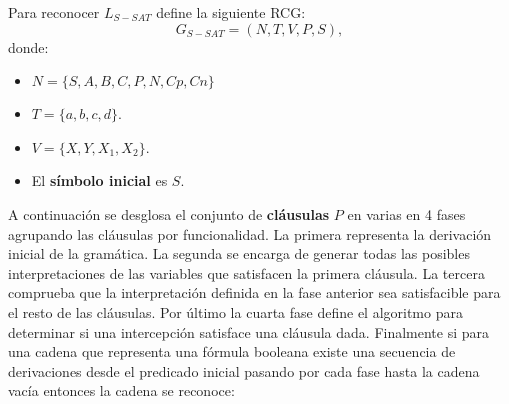 \documentclass[12pt]{article}
\begin{document}
Para reconocer $L_{S-SAT}$ define la siguiente RCG:
\[
    G_{S-SAT} = (N, T, V, P, S),
\]
donde:

\begin{itemize}
    \item $N=\{S,A,B,C,P,N,Cp,Cn\}$
    \item $T=\{a,b,c,d\}$.
    \item $V=\{X,Y,X_1,X_2\}$.
    \item El \textbf{símbolo inicial} es $S$.
\end{itemize}

A continuación se desglosa el conjunto de \textbf{cláusulas} $P$ en varias en 4 fases agrupando las cláusulas por funcionalidad.
La primera representa la derivación inicial de la gramática. La segunda se encarga de generar todas las posibles
interpretaciones de las variables que satisfacen la primera cláusula. La tercera comprueba que la interpretación
definida en la fase anterior sea satisfacible para el resto de las cláusulas. Por último la cuarta fase
define el algoritmo para determinar si una intercepción satisface una cláusula dada. Finalmente
si para una cadena que representa una fórmula booleana existe una secuencia de derivaciones desde el predicado
inicial pasando por cada fase hasta la cadena vacía entonces la cadena se reconoce:
\end{document}
